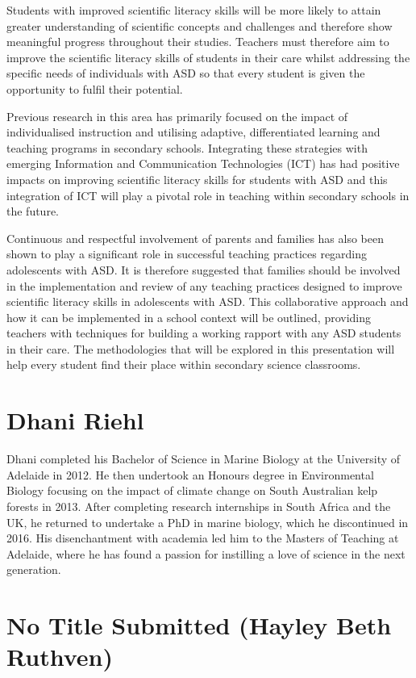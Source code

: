 \documentclass[twoside,14pt,a4paper,notitlepage]{memoir}
\begin{document}
Students with improved scientific literacy skills will be more likely to attain greater understanding of scientific concepts and challenges and therefore show meaningful progress throughout their studies. Teachers must therefore aim to improve the scientific literacy skills of students in their care whilst addressing the specific needs of individuals with ASD so that every student is given the opportunity to fulfil their potential.

Previous research in this area has primarily focused on the impact of individualised instruction and utilising adaptive, differentiated learning and teaching programs in secondary schools. Integrating these strategies with emerging Information and Communication Technologies (ICT) has had positive impacts on improving scientific literacy skills for students with ASD and this integration of ICT will play a pivotal role in teaching within secondary schools in the future.

Continuous and respectful involvement of parents and families has also been shown to play a significant role in successful teaching practices regarding adolescents with ASD. It is therefore suggested that families should be involved in the implementation and review of any teaching practices designed to improve scientific literacy skills in adolescents with ASD. This collaborative approach and how it can be implemented in a school context will be outlined, providing teachers with techniques for building a working rapport with any ASD students in their care. The methodologies that will be explored in this presentation will help every student find their place within secondary science classrooms.

\section*{Dhani Riehl}

Dhani completed his Bachelor of Science in Marine Biology at the University of Adelaide in 2012. He then undertook an Honours degree in Environmental Biology focusing on the impact of climate change on South Australian kelp forests in 2013. After completing research internships in South Africa and the UK, he returned to undertake a PhD in marine biology, which he discontinued in 2016. His disenchantment with academia led him to the Masters of Teaching at Adelaide, where he has found a passion for instilling a love of science in the next generation. 



\section*{No Title Submitted (Hayley Beth Ruthven)}
\label{aut:ruthven}
\end{document}
